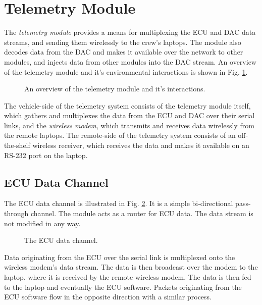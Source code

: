\section{Telemetry Module\label{sec:Telemetry-Module-Design}}

The \emph{telemetry module} provides a means for multiplexing the ECU and DAC data streams, and sending them wirelessly to the crew's laptops. The module also decodes data from the DAC and makes it available over the network to other modules, and injects data from other modules into the DAC stream. An overview of the telemetry module and it's environmental interactions is shown in Fig. \ref{fig:design_telemetry_overview_block}.

\begin{figure}[H]
	\centering
	
	\caption{An overview of the telemetry module and it's interactions.}
	\label{fig:design_telemetry_overview_block}
\end{figure}

The vehicle-side of the telemetry system consists of the telemetry module itself, which gathers and multiplexes the data from the ECU and DAC over their serial links, and the \emph{wireless modem}, which transmits and receives data wirelessly from the remote laptops. The remote-side of the telemetry system consists of an off-the-shelf wireless receiver, which receives the data and makes it available on an RS-232 port on the laptop.

\subsection{ECU Data Channel}

The ECU data channel is illustrated in Fig. \ref{fig:ecu_data_channel}. It is a simple bi-directional pass-through channel. The module acts as a router for ECU data. The data stream is not modified in any way. 

\begin{figure}[H]
	\centering
	
	\caption{The ECU data channel.}
	\label{fig:ecu_data_channel}
\end{figure}

Data originating from the ECU over the serial link is multiplexed onto the wireless modem's data stream. The data is then broadcast over the modem to the laptop, where it is received by the remote wireless modem. The data is then fed to the laptop and eventually the ECU software. Packets originating from the ECU software flow in the opposite direction with a similar process.

